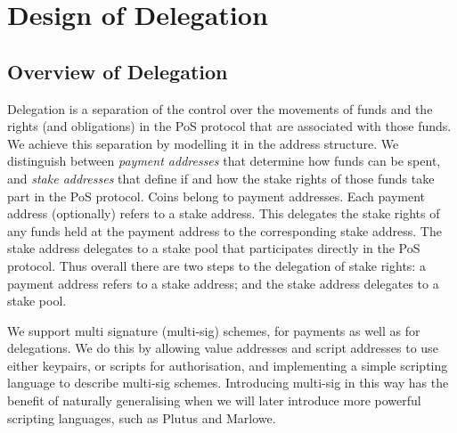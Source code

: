\documentclass[11pt,a4paper,dvipsnames,twosided]{article}
\begin{document}
\section{Design of Delegation}
\label{design-of-delegation}

\newcommand{\hash}[1]{\ensuremath{\mathcal{H}(#1)}}

\subsection{Overview of Delegation}
\label{overview-of-delegation}

Delegation is a separation of the control over the movements of funds and the
rights (and obligations) in the PoS protocol that are associated with those
funds. We achieve this separation by modelling it in the address structure. We
distinguish between \emph{payment addresses} that determine how funds can be
spent, and \emph{stake addresses} that define if and how the stake rights of
those funds take part in the PoS protocol. Coins belong to payment addresses.
Each payment address (optionally) refers to a stake address. This delegates the
stake rights of any funds held at the payment address to the corresponding stake
address. The stake address delegates to a stake pool that participates directly
in the PoS protocol. Thus overall there are two steps to the delegation of stake
rights: a payment address refers to a stake address; and the stake address
delegates to a stake pool.

We support multi signature (multi-sig) schemes, for payments as well as for
delegations. We do this by allowing value addresses and script addresses to use
either keypairs, or scripts for authorisation, and implementing a simple
scripting language to describe multi-sig schemes. Introducing multi-sig in this
way has the benefit of naturally generalising when we will later introduce more
powerful scripting languages, such as Plutus and Marlowe.
\end{document}
